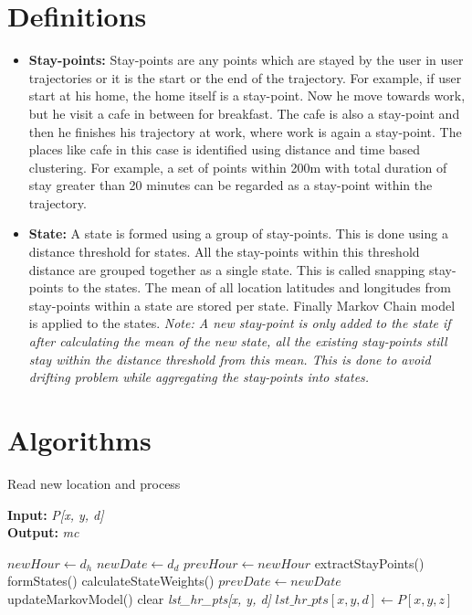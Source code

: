 \documentclass{article}
\begin{document}
\section{Definitions}
\begin{itemize}
	\item \textbf{Stay-points:} Stay-points are any points which are stayed by the user in user trajectories or it is the start or the end of the trajectory. For example, if user start at his home, the home itself is a stay-point. Now he move towards work, but he visit a cafe in between for breakfast. The cafe is also a stay-point and then he finishes his trajectory at work, where work is again a stay-point. The places like cafe in this case is identified using distance and time based clustering. For example, a set of points within 200m with total duration of stay greater than 20 minutes can be regarded as a stay-point within the trajectory.
	\item \textbf{State:} A state is formed using a group of stay-points. This is done using a distance threshold for states. All the stay-points within this threshold distance are grouped together as a single state. This is called snapping stay-points to the states. The mean of all location latitudes and longitudes from stay-points within a state are stored per state. Finally Markov Chain model is applied to the states. \textit{Note: A new stay-point is only added to the state if after calculating the mean of the new state, all the existing stay-points still stay within the distance threshold from this mean. This is done to avoid drifting problem while aggregating the stay-points into states.}
\end{itemize}

\section{Algorithms}

\begin{algorithm}
\caption{Read new location and process}
\label{pseudoPSO}
\hspace*{\algorithmicindent} \textbf{Input:}  \textit{P[x, y, d]} \\
\hspace*{\algorithmicindent} \textbf{Output:}  \textit{mc} 
\begin{algorithmic}[1]
\State $newHour \gets d_h$
\State $newDate \gets d_d$
	\State $prevHour \gets newHour$
	\State extractStayPoints()
	\State formStates()
	\State calculateStateWeights()
		\State $prevDate \gets newDate$
		\State updateMarkovModel()
	\EndIf
	\State clear \textit{lst\_hr\_pts[x, y, d]}
\Else
	\State $lst\_hr\_pts[x, y, d] \gets P[x, y, z]$
\EndIf
\EndFor
\end{algorithmic}
\end{algorithm}
\end{document}
